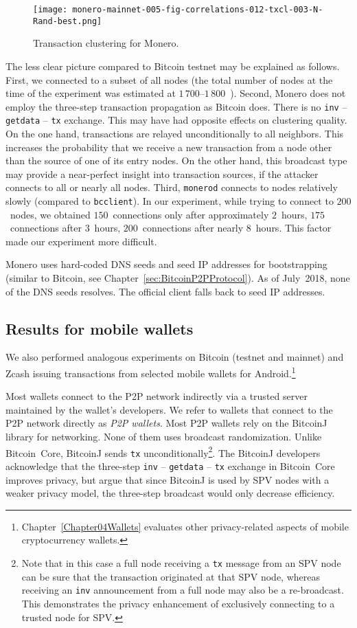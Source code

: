 \begin{figure}[!t]
	\centering
	\texttt{[image: monero-mainnet-005-fig-correlations-012-txcl-003-N-Rand-best.png]}
	\caption{Transaction clustering for Monero.}
	\label{fig:monero}
\end{figure}

The less clear picture compared to Bitcoin testnet may be explained as follows.
First, we connected to a subset of all nodes (the total number of nodes at the time of the experiment was estimated at $1\,700$--$1\,800$~\cite{MoneroHash}).
Second, Monero does not employ the three-step transaction propagation as Bitcoin does.
There is no \texttt{inv} -- \texttt{getdata} -- \texttt{tx} exchange.
This may have had opposite effects on clustering quality.
On the one hand, transactions are relayed unconditionally to all neighbors.
This increases the probability that we receive a new transaction from a node other than the source of one of its entry nodes.
On the other hand, this broadcast type may provide a near-perfect insight into transaction sources, if the attacker connects to all or nearly all nodes.
Third, \texttt{monerod} connects to nodes relatively slowly (compared to \texttt{bcclient}).
In our experiment, while trying to connect to $200$~nodes, we obtained $150$~connections only after approximately $2$~hours, $175$~connections after $3$~hours, $200$~connections after nearly $8$~hours.
This factor made our experiment more difficult.

Monero uses hard-coded DNS seeds and seed IP addresses for bootstrapping (similar to Bitcoin, see Chapter~\ref{sec:BitcoinP2PProtocol}).
As of July~2018, none of the DNS seeds resolves.
The official client falls back to seed IP addresses.


\subsection{Results for mobile wallets}

We also performed analogous experiments on Bitcoin (testnet and mainnet) and Zcash issuing transactions from selected mobile wallets for Android.\footnote{Chapter~\ref{Chapter04Wallets} evaluates other privacy-related aspects of mobile cryptocurrency wallets.}

Most wallets connect to the P2P network indirectly via a trusted server maintained by the wallet's developers.
We refer to wallets that connect to the P2P network directly as \textit{P2P wallets}.
Most P2P wallets rely on the BitcoinJ library for networking.
None of them uses broadcast randomization.
Unlike Bitcoin~Core, BitcoinJ sends \texttt{tx} unconditionally\footnote{Note that in this case a full node receiving a \texttt{tx} message from an SPV node can be sure that the transaction originated at that SPV node, whereas receiving an \texttt{inv} announcement from a full node may also be a re-broadcast. This demonstrates the privacy enhancement of exclusively connecting to a trusted node for SPV.}.
The BitcoinJ developers acknowledge that the three-step \texttt{inv} -- \texttt{getdata} -- \texttt{tx} exchange in Bitcoin~Core improves privacy, but argue that since BitcoinJ is used by SPV nodes with a weaker privacy model, the three-step broadcast would only decrease efficiency.


